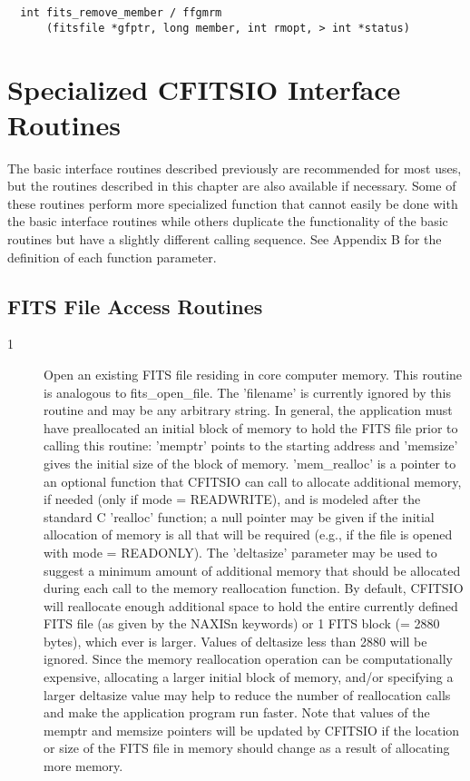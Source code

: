 \documentclass[11pt]{book}
\begin{document}
\begin{verbatim}
  int fits_remove_member / ffgmrm
      (fitsfile *gfptr, long member, int rmopt, > int *status)
\end{verbatim}

\chapter{ Specialized CFITSIO Interface Routines }

The basic interface routines described previously are recommended
for most uses, but the routines described in this chapter
are also available if necessary.  Some of these routines perform more
specialized function that cannot easily be done with the basic
interface routines while others duplicate the functionality of the
basic routines but have a slightly different calling sequence.
See Appendix B for the definition of each function parameter.


\section{FITS File Access Routines}


\begin{description}
\item[1 ] Open an existing FITS file residing in core computer memory.  This
routine is analogous to fits\_open\_file.   The 'filename'  is
currently ignored by this routine and may be any arbitrary string. In
general, the application must have preallocated an initial block of
memory to hold the FITS file prior to calling this routine:  'memptr'
points to the starting address and 'memsize' gives the initial size of
the block of memory.  'mem\_realloc' is a pointer to an optional
function that CFITSIO can call to allocate additional memory, if needed
(only if mode = READWRITE), and is modeled after the standard C
'realloc' function;  a null pointer may be given if the initial
allocation of memory is all that will be required (e.g., if the file is
opened with mode = READONLY).  The 'deltasize' parameter may be used to
suggest a minimum amount of additional memory that should be allocated
during each call to the memory reallocation function.  By default,
CFITSIO will reallocate enough additional space to hold the entire
currently defined FITS file (as given by the NAXISn keywords) or 1 FITS
block (= 2880 bytes), which ever is larger.  Values of deltasize less
than 2880 will be ignored.  Since the memory reallocation operation can
be computationally expensive, allocating a larger initial block of
memory, and/or specifying a larger deltasize value may help to reduce
the number of reallocation calls and make the application program run
faster.  Note that values of the memptr and memsize pointers will be updated
by CFITSIO if the location or size of the FITS file in memory
should change as a result of allocating more memory. \label{ffomem}
\end{description}
\end{document}
